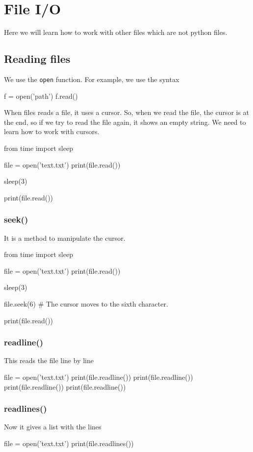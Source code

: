 \section{File I/O}

Here we will learn how to work with other files which are not python files. 

\subsection{Reading files}

We use the \verb|open| function. For example, we use the syntax
\begin{listing}{1}
f = open('path')
f.read()
\end{listing}    
When files reads a file, it uses a cursor. So, when we read the file, the cursor is at the end, so if we try to read the file again, it shows an empty string. We need to learn how to work with cursors.
\begin{listing}{1}
from time import sleep 

file = open('text.txt')
print(file.read())

sleep(3)

print(file.read())    
\end{listing}

\subsubsection{seek()} It is a method to manipulate the cursor. 
\begin{listing}{1}
from time import sleep 

file = open('text.txt')
print(file.read())

sleep(3)

file.seek(6) # The cursor moves to the sixth character.

print(file.read())    
\end{listing}

\subsubsection{readline()} This reads the file line by line 
\begin{listing}{1}
file = open('text.txt')
print(file.readline())
print(file.readline())
print(file.readline())
print(file.readline())
\end{listing}

\subsubsection{readlines()} Now it gives a list with the lines
\begin{listing}{1}
file = open('text.txt')
print(file.readlines())
\end{listing}

